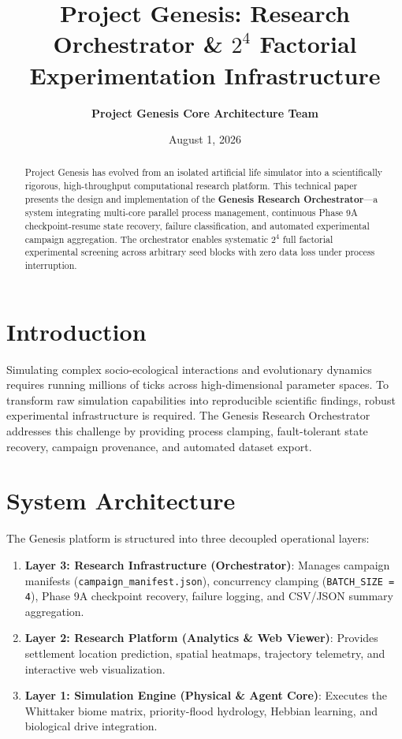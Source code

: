 \documentclass[11pt,a4paper]{article}
\title{\textbf{Project Genesis: Research Orchestrator \& $2^4$ Factorial Experimentation Infrastructure}}
\author{\textbf{Project Genesis Core Architecture Team}}
\date{August 1, 2026}
\begin{document}
\maketitle

\begin{abstract}
Project Genesis has evolved from an isolated artificial life simulator into a scientifically rigorous, high-throughput computational research platform. This technical paper presents the design and implementation of the \textbf{Genesis Research Orchestrator}—a system integrating multi-core parallel process management, continuous Phase 9A checkpoint-resume state recovery, failure classification, and automated experimental campaign aggregation. The orchestrator enables systematic $2^4$ full factorial experimental screening across arbitrary seed blocks with zero data loss under process interruption.
\end{abstract}

\section{Introduction}
Simulating complex socio-ecological interactions and evolutionary dynamics requires running millions of ticks across high-dimensional parameter spaces. To transform raw simulation capabilities into reproducible scientific findings, robust experimental infrastructure is required. The Genesis Research Orchestrator addresses this challenge by providing process clamping, fault-tolerant state recovery, campaign provenance, and automated dataset export.

\section{System Architecture}
The Genesis platform is structured into three decoupled operational layers:

\begin{enumerate}
    \item \textbf{Layer 3: Research Infrastructure (Orchestrator)}: Manages campaign manifests (\texttt{campaign\_manifest.json}), concurrency clamping (\texttt{BATCH\_SIZE = 4}), Phase 9A checkpoint recovery, failure logging, and CSV/JSON summary aggregation.
    \item \textbf{Layer 2: Research Platform (Analytics \& Web Viewer)}: Provides settlement location prediction, spatial heatmaps, trajectory telemetry, and interactive web visualization.
    \item \textbf{Layer 1: Simulation Engine (Physical \& Agent Core)}: Executes the Whittaker biome matrix, priority-flood hydrology, Hebbian learning, and biological drive integration.
\end{enumerate}
\end{document}

